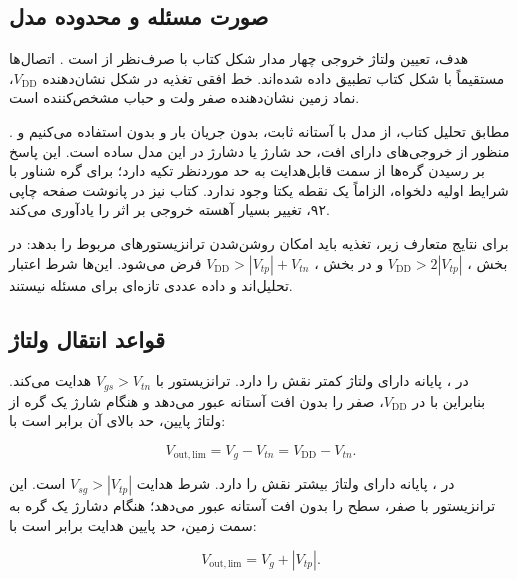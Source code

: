 \label{sec:ex20}

\subsection*{صورت مسئله و محدوده مدل}

هدف، تعیین ولتاژ خروجی چهار مدار شکل  کتاب با صرف‌نظر از  است \cite[صفحه چاپی ۹۷]{weste}. اتصال‌ها مستقیماً با شکل کتاب تطبیق داده شده‌اند. خط افقی تغذیه در شکل نشان‌دهنده \(V_{\mathrm{DD}}\)، نماد زمین نشان‌دهنده صفر ولت و حباب  مشخص‌کننده  است.

مطابق تحلیل  کتاب، از مدل  با آستانه ثابت، بدون جریان بار  و بدون  استفاده می‌کنیم \cite[بخش ]{weste} و \cite[اسلاید ۱۲]{dcslides}. منظور از خروجی‌های دارای افت، حد شارژ یا دشارژ در این مدل ساده است. این پاسخ بر رسیدن گره‌ها از سمت قابل‌هدایت به حد موردنظر تکیه دارد؛ برای گره شناور با شرایط اولیه دلخواه، الزاماً یک نقطه  یکتا وجود ندارد. کتاب نیز در پانوشت صفحه چاپی ۹۲، تغییر بسیار آهسته خروجی بر اثر  را یادآوری می‌کند.

برای نتایج متعارف زیر، تغذیه باید امکان روشن‌شدن ترانزیستورهای مربوط را بدهد: در بخش ، \(V_{\mathrm{DD}}>2|V_{tp}|\) و در بخش ، \(V_{\mathrm{DD}}>|V_{tp}|+V_{tn}\) فرض می‌شود. این‌ها شرط اعتبار تحلیل‌اند و داده عددی تازه‌ای برای مسئله نیستند.

\subsection*{قواعد انتقال ولتاژ}

در ، پایانه دارای ولتاژ کمتر نقش  را دارد. ترانزیستور با \(V_{gs}>V_{tn}\) هدایت می‌کند. بنابراین با  در \(V_{\mathrm{DD}}\)، صفر را بدون افت آستانه عبور می‌دهد و هنگام شارژ یک گره از ولتاژ پایین، حد بالای آن برابر است با:

\nopagebreak[3]
\begin{equation}\label{eq:ex20-1}
V_{\mathrm{out,lim}}=V_g-V_{tn}=V_{\mathrm{DD}}-V_{tn}.
\end{equation}

در ، پایانه دارای ولتاژ بیشتر نقش  را دارد. شرط هدایت \(V_{sg}>|V_{tp}|\) است. این ترانزیستور با  صفر، سطح  را بدون افت آستانه عبور می‌دهد؛ هنگام دشارژ یک گره به سمت زمین، حد پایین هدایت برابر است با:

\nopagebreak[3]
\begin{equation}\label{eq:ex20-2}
V_{\mathrm{out,lim}}=V_g+|V_{tp}|.
\end{equation}

